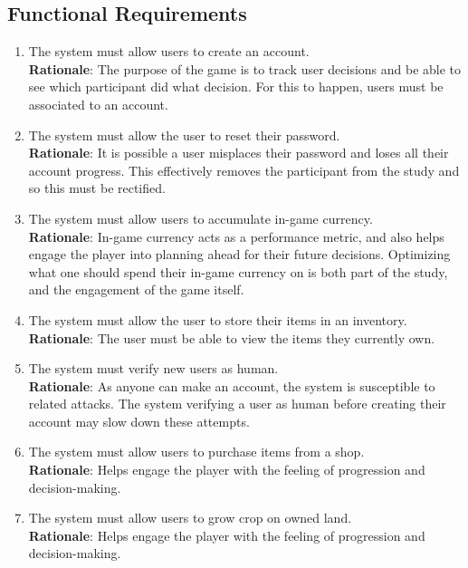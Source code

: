 \documentclass{article}
\begin{document}
\subsection{Functional Requirements}
\begin{enumerate}[{FR}1. ]
  \item The system must allow users to create an account.\\
  \textbf{Rationale}: The purpose of the game is to track user decisions and be able to see which participant did what decision. For this to happen, users must be associated to an account.
  \item The system must allow the user to reset their password.\\
  \textbf{Rationale}: It is possible a user misplaces their password and loses all their account progress. This effectively removes the participant from the study and so this must be rectified.
  \item The system must allow users to accumulate in-game currency.\\
  \textbf{Rationale}: In-game currency acts as a performance metric, and also helps engage the player into planning ahead for their future decisions. Optimizing what one should spend their in-game currency on is both part of the study, and the engagement of the game itself.
  \item The system must allow the user to store their items in an inventory.
  \textbf{Rationale}: The user must be able to view the items they currently own.
  \item The system must verify new users as human.\\
  \textbf{Rationale}: As anyone can make an account, the system is susceptible to related attacks. The system verifying a user as human before creating their account may slow down these attempts.
  \item The system must allow users to purchase items from a shop.\\
  \textbf{Rationale}: Helps engage the player with the feeling of progression and decision-making.
  \item The system must allow users to grow crop on owned land.\\
  \textbf{Rationale}: Helps engage the player with the feeling of progression and decision-making.

\end{enumerate}
\end{document}
